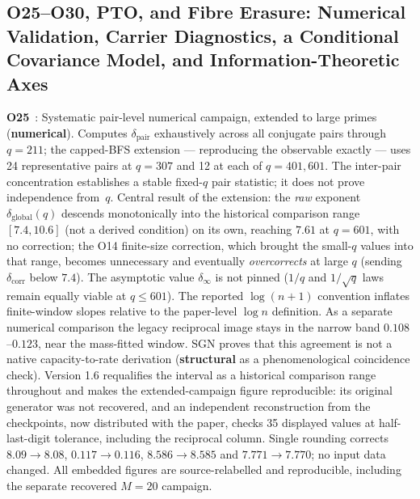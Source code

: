 \documentclass[11pt,a4paper]{article}
\newcommand{\sstruct}{\textcolor{cstruct}{\textbf{structural}}}
\newcommand{\snum}{\textcolor{cnum}{\textbf{numerical}}}
\begin{document}
  \subsection{O25--O30, PTO, and Fibre Erasure: Numerical Validation, Carrier Diagnostics,
    a Conditional Covariance Model, and Information-Theoretic Axes}

    \textbf{O25}~\cite{Beau2026a29}: Systematic pair-level numerical campaign, extended to large primes (\snum).
    Computes $\delta_{\mathrm{pair}}$ exhaustively across all conjugate pairs through $q=211$;
    the capped-BFS extension --- reproducing the observable exactly --- uses 24 representative
    pairs at $q=307$ and 12 at each of $q=401,601$.
    The inter-pair concentration establishes a stable fixed-$q$ pair statistic; it does not
    prove independence from~$q$.
    Central result of the extension: the \emph{raw} exponent $\delta_{\mathrm{global}}(q)$ descends
    monotonically into the historical comparison range $[7.4, 10.6]$ (not a derived condition) on its
    own, reaching $7.61$ at $q = 601$, with no correction; the O14 finite-size correction, which brought
    the small-$q$ values into that range, becomes unnecessary and eventually \emph{overcorrects} at large
    $q$ (sending $\delta_{\mathrm{corr}}$ below $7.4$).
    The asymptotic value $\delta_\infty$ is not pinned ($1/q$ and $1/\sqrt{q}$ laws remain equally
    viable at $q \le 601$).  The reported $\log(n+1)$ convention inflates finite-window slopes
    relative to the paper-level $\log n$ definition.  As a separate numerical comparison the
    legacy reciprocal image stays in the narrow band $0.108$--$0.123$, near the mass-fitted window.
    SGN proves that this agreement is not a native capacity-to-rate derivation (\sstruct{} as a
    phenomenological coincidence check).
    Version 1.6 requalifies the interval as a historical comparison range throughout and makes the
    extended-campaign figure reproducible: its original generator was not recovered, and an independent
    reconstruction from the checkpoints, now distributed with the paper, checks 35 displayed values at half-last-digit tolerance, including the reciprocal column.
    Single rounding corrects $8.09\to8.08$, $0.117\to0.116$, $8.586\to8.585$ and $7.771\to7.770$;
    no input data changed. All embedded figures are source-relabelled and reproducible,
    including the separate recovered $M=20$ campaign.
\end{document}
